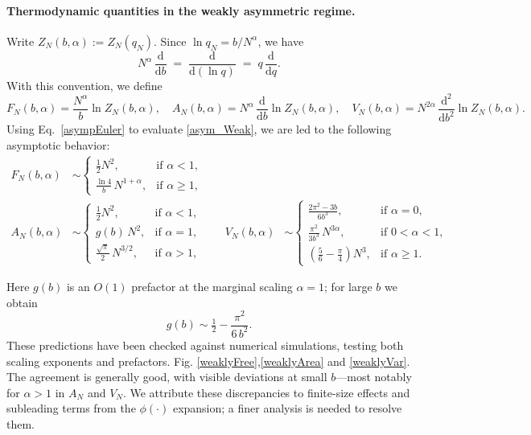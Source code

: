 \documentclass[pdflatex,sn-mathphys-num]{sn-jnl}
\theoremstyle{definition}
\theoremstyle{remark}
\numberwithin{equation}{section}
\begin{document}
\paragraph*{Thermodynamic quantities in the weakly asymmetric regime.}
Write $Z_N(b,\alpha):=Z_N(q_N)$. Since $\ln q_N=b/N^{\alpha}$, we have
\[
    N^{\alpha}\,\frac{\mathrm d}{\mathrm db}
    \;=\;
    \frac{\mathrm d}{\mathrm d(\ln q)} 
    \;=\;
    q\,\frac{\mathrm d}{\mathrm dq}.
\]
With this convention, we define
\begin{equation}
    F_N(b,\alpha)=\frac{N^{\alpha}}{b}\ln Z_N(b,\alpha), 
    \quad 
A_N(b,\alpha)=N^{\alpha}\,\frac{\mathrm d}{\mathrm db}\ln Z_N(b,\alpha),
    \quad
V_N(b,\alpha)=N^{2\alpha}\,\frac{\mathrm d^2}{\mathrm db^2}\ln Z_N(b,\alpha).
\end{equation}
Using Eq.~\eqref{asympEuler} to evaluate \eqref{asym_Weak}, we are led to the following asymptotic behavior:
\begin{equation}
\label{eq:Weakly}
\begin{aligned}
F_N(b,\alpha) &\sim 
\begin{cases}
\frac{1}{2}N^2, & \text{if }\alpha<1,\\
\frac{\ln 4}{b}\,N^{1+\alpha}, & \text{if }\alpha\ge 1,
\end{cases}\\[0.6ex]
A_N(b,\alpha) &\sim 
\begin{cases}
\frac{1}{2}N^2, & \text{if }\alpha<1,\\
g(b)\,N^2, & \text{if }\alpha=1,\\
\frac{\sqrt{\pi}}{2}\,N^{3/2}, & \text{if }\alpha>1,
\end{cases}
\qquad
V_N(b,\alpha) &\sim 
\begin{cases}
\frac{2\pi^2-3b}{6b^3}, & \text{if }\alpha=0,\\
\frac{\pi^2}{3b^3}\,N^{3\alpha}, & \text{if }0<\alpha<1,\\
\left(\frac{5}{6}-\frac{\pi}{4}\right)N^3, & \text{if }\alpha\ge 1.
\end{cases}
\end{aligned}
\end{equation}




Here $g(b)$ is an $O(1)$ prefactor at the marginal scaling $\alpha=1$; for large $b$ we obtain
\[
    g(b)\sim \tfrac{1}{2}-\frac{\pi^2}{6\,b^2}.
\]
These predictions have been checked against numerical simulations, testing both scaling exponents and prefactors. Fig. \ref{weaklyFree},\ref{weaklyArea} and \ref{weaklyVar}. The agreement is generally good, with visible deviations at small $b$—most notably for $\alpha>1$ in $A_N$ and $V_N$. We attribute these discrepancies to finite-size effects and subleading terms from the $\phi(\cdot)$ expansion; a finer analysis is needed to resolve them.
\end{document}
